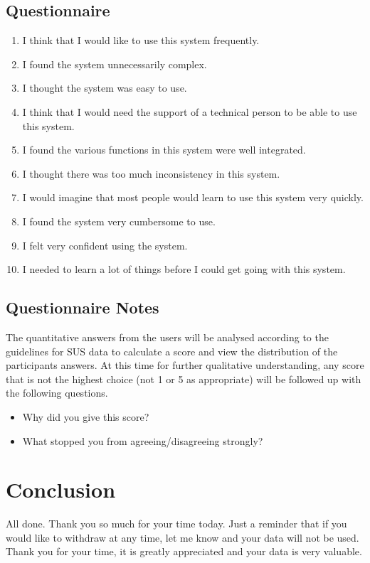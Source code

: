 \documentclass[a4 paper, 10pt]{article}
\begin{document}
    \subsection*{Questionnaire}
    \begin{multicols}{2}
        
    
        \begin{enumerate}
            \item I think that I would like to use this system frequently.
            \item I found the system unnecessarily complex.
            \item I thought the system was easy to use.
            \item I think that I would need the support of a technical person to be able to use this system.
            \item I found the various functions in this system were well integrated.
            \item I thought there was too much inconsistency in this system.
            \item I would imagine that most people would learn to use this system very quickly.
            \item I found the system very cumbersome to use.
            \item I felt very confident using the system.
            \item I needed to learn a lot of things before I could get going with this system.
        \end{enumerate}
    \end{multicols}  

    \subsection*{Questionnaire Notes}
    The quantitative answers from the users will be analysed according to the guidelines for SUS data to calculate a score and view the distribution of the participants answers. At this time for further qualitative understanding, any score that is not the highest choice (not 1 or 5 as appropriate) will be followed up with the following questions.
    \begin{itemize}
        \item Why did you give this score?
        \item What stopped you from agreeing/disagreeing strongly?
    \end{itemize} 


\section*{Conclusion}
    \begin{itshape}
        All done. Thank you so much for your time today. Just a reminder that if you would like to withdraw at any time, let me know and your data will not be used. Thank you for your time, it is greatly appreciated and your data is very valuable.
    \end{itshape}
\end{document}
